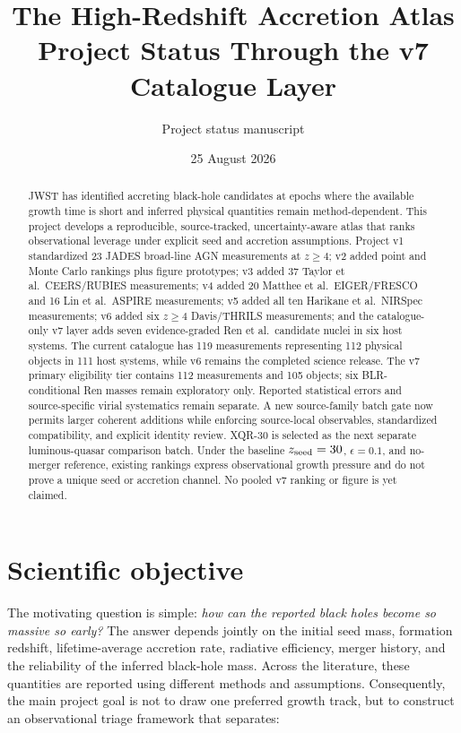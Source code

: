 \documentclass[11pt]{article}
\title{\textbf{The High-Redshift Accretion Atlas}\\
\large Project Status Through the v7 Catalogue Layer}
\author{Project status manuscript}
\date{25 August 2026}
\begin{document}
\maketitle

\begin{abstract}
JWST has identified accreting black-hole candidates at epochs where the available growth time is short and inferred physical quantities remain method-dependent. This project develops a reproducible, source-tracked, uncertainty-aware atlas that ranks observational leverage under explicit seed and accretion assumptions. Project v1 standardized 23 JADES broad-line AGN measurements at $z\geq4$; v2 added point and Monte Carlo rankings plus figure prototypes; v3 added 37 Taylor et al.\ CEERS/RUBIES measurements; v4 added 20 Matthee et al.\ EIGER/FRESCO and 16 Lin et al.\ ASPIRE measurements; v5 added all ten Harikane et al.\ NIRSpec measurements; v6 added six $z\geq4$ Davis/THRILS measurements; and the catalogue-only v7 layer adds seven evidence-graded Ren et al.\ candidate nuclei in six host systems. The current catalogue has 119 measurements representing 112 physical objects in 111 host systems, while v6 remains the completed science release. The v7 primary eligibility tier contains 112 measurements and 105 objects; six BLR-conditional Ren masses remain exploratory only. Reported statistical errors and source-specific virial systematics remain separate. A new source-family batch gate now permits larger coherent additions while enforcing source-local observables, standardized compatibility, and explicit identity review. XQR-30 is selected as the next separate luminous-quasar comparison batch. Under the baseline $z_{\rm seed}=30$, $\epsilon=0.1$, and no-merger reference, existing rankings express observational growth pressure and do not prove a unique seed or accretion channel. No pooled v7 ranking or figure is yet claimed.
\end{abstract}

\section{Scientific objective}

The motivating question is simple: \emph{how can the reported black holes become so massive so early?} The answer depends jointly on the initial seed mass, formation redshift, lifetime-average accretion rate, radiative efficiency, merger history, and the reliability of the inferred black-hole mass. Across the literature, these quantities are reported using different methods and assumptions. Consequently, the main project goal is not to draw one preferred growth track, but to construct an observational triage framework that separates:
\end{document}
